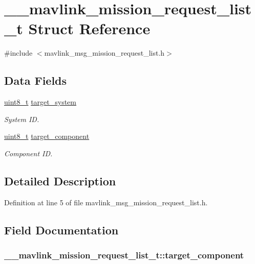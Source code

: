 \hypertarget{struct____mavlink__mission__request__list__t}{\section{\-\_\-\-\_\-mavlink\-\_\-mission\-\_\-request\-\_\-list\-\_\-t Struct Reference}
\label{struct____mavlink__mission__request__list__t}
}


{\ttfamily \#include $<$mavlink\-\_\-msg\-\_\-mission\-\_\-request\-\_\-list.\-h$>$}

\subsection*{Data Fields}
\begin{DoxyCompactItemize}
\item 
\hyperlink{stdint_8h_aba7bc1797add20fe3efdf37ced1182c5}{uint8\-\_\-t} \hyperlink{struct____mavlink__mission__request__list__t_ae8b0c8bffa1ecde59f37cdf8b65f47d4}{target\-\_\-system}
\begin{DoxyCompactList}\small\item\em System I\-D. \end{DoxyCompactList}\item 
\hyperlink{stdint_8h_aba7bc1797add20fe3efdf37ced1182c5}{uint8\-\_\-t} \hyperlink{struct____mavlink__mission__request__list__t_a8214615734dcc050fdcd5ccaad31b550}{target\-\_\-component}
\begin{DoxyCompactList}\small\item\em Component I\-D. \end{DoxyCompactList}\end{DoxyCompactItemize}


\subsection{Detailed Description}


Definition at line 5 of file mavlink\-\_\-msg\-\_\-mission\-\_\-request\-\_\-list.\-h.



\subsection{Field Documentation}
\hypertarget{struct____mavlink__mission__request__list__t_a8214615734dcc050fdcd5ccaad31b550}{
\subsubsection[{target\-\_\-component}]{ \-\_\-\-\_\-mavlink\-\_\-mission\-\_\-request\-\_\-list\-\_\-t\-::target\-\_\-component}}\label{struct____mavlink__mission__request__list__t_a8214615734dcc050fdcd5ccaad31b550}


